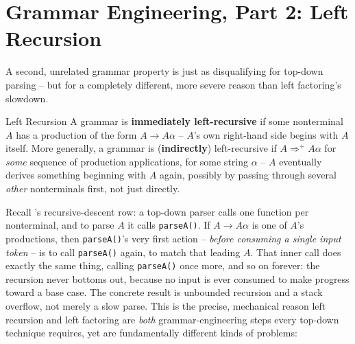 \documentclass[full-course-notes.tex]{subfiles}
\begin{document}
\section{Grammar Engineering, Part 2: Left Recursion}
\label{sec:l8-left-recursion}

\dbtag A second, unrelated grammar property is just as disqualifying for top-down parsing --
but for a completely different, more severe reason than left factoring's slowdown.

\begin{defbox}{Left Recursion}
A grammar is \textbf{immediately left-recursive} if some nonterminal $A$ has a production of
the form $A \to A\alpha$ -- $A$'s own right-hand side begins with $A$ itself. More generally, a
grammar is (\textbf{indirectly}) left-recursive if $A \Rightarrow^{+} A\alpha$ for \emph{some}
sequence of production applications, for some string $\alpha$ -- $A$ eventually derives
something beginning with $A$ again, possibly by passing through several \emph{other}
nonterminals first, not just directly.
\end{defbox}

\begin{coreidea}
Recall 's recursive-descent row: a top-down parser calls one function
per nonterminal, and to parse $A$ it calls \texttt{parseA()}. If $A \to A\alpha$ is one of
$A$'s productions, then \texttt{parseA()}'s very first action -- \emph{before consuming a
single input token} -- is to call \texttt{parseA()} again, to match that leading $A$. That
inner call does exactly the same thing, calling \texttt{parseA()} once more, and so on
forever: the recursion never bottoms out, because no input is ever consumed to make progress
toward a base case. The concrete result is unbounded recursion and a stack overflow, not merely
a slow parse. This is the precise, mechanical reason left recursion and left factoring are
\emph{both} grammar-engineering steps every top-down technique requires, yet are fundamentally
different kinds of problems:
\end{coreidea}
\end{document}
